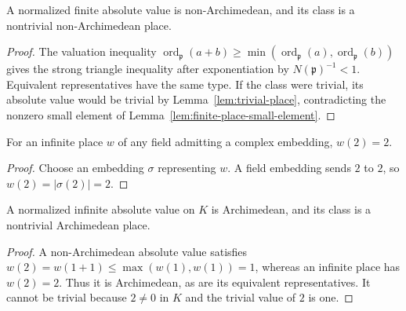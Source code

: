 \begin{lemma}\label{lem:finite-place-type}
\leanok
{}
A normalized finite absolute value is non-Archimedean, and its class is
a nontrivial non-Archimedean place.
\end{lemma}
\begin{proof}
The valuation inequality
$\operatorname{ord}_{\mathfrak p}(a+b)\geq
\min(\operatorname{ord}_{\mathfrak p}(a),\operatorname{ord}_{\mathfrak p}(b))$
gives the strong triangle inequality after exponentiation by
$N(\mathfrak p)^{-1}<1$. Equivalent representatives have the same type.
If the class were trivial, its absolute value would be trivial by
Lemma~\ref{lem:trivial-place}, contradicting the nonzero small element
of Lemma~\ref{lem:finite-place-small-element}.
\end{proof}

\begin{lemma}\label{lem:infinite-place-two}
\leanok
{}
For an infinite place $w$ of any field admitting a complex embedding,
$w(2)=2$.
\end{lemma}
\begin{proof}
Choose an embedding $\sigma$ representing $w$. A field embedding sends
$2$ to $2$, so $w(2)=|\sigma(2)|=2$.
\end{proof}

\begin{lemma}\label{lem:infinite-place-type}
\leanok
{}
A normalized infinite absolute value on $K$ is Archimedean, and its class
is a nontrivial Archimedean place.
\end{lemma}
\begin{proof}
A non-Archimedean absolute value satisfies
$w(2)=w(1+1)\leq\max(w(1),w(1))=1$, whereas an infinite place has
$w(2)=2$. Thus it is Archimedean, as are its equivalent representatives.
It cannot be trivial because $2\ne0$ in $K$ and the trivial value of $2$
is one.
\end{proof}


